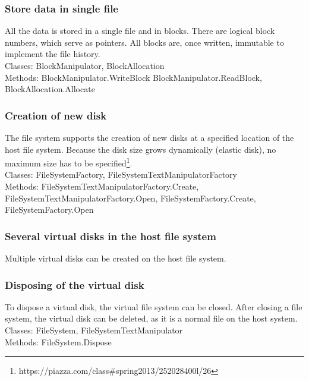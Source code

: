 \documentclass[JCDReport.tex]{subfiles}
\begin{document}
\subsubsection{Store data in single file}
All the data is stored in a single file and in blocks. There are logical block numbers, which serve as pointers. All blocks are, once written, immutable to implement the file history.\\
Classes: BlockManipulator, BlockAllocation\\
Methods: BlockManipulator.WriteBlock BlockManipulator.ReadBlock, BlockAllocation.Allocate

\subsubsection{Creation of new disk}
The file system supports the creation of new disks at a specified location of the host file system. Because the disk size grows dynamically (elastic disk), no maximum size has to be specified\footnote{https://piazza.com/class\#spring2013/252028400l/26}.\\
Classes: FileSystemFactory, FileSystemTextManipulatorFactory\\
Methods: FileSystemTextManipulatorFactory.Create, FileSystemTextManipulatorFactory.Open, FileSystemFactory.Create, FileSystemFactory.Open

\subsubsection{Several virtual disks in the host file system}
Multiple virtual disks can be created on the host file system.

\subsubsection{Disposing of the virtual disk}
To dispose a virtual disk, the virtual file system can be closed. After closing a file system, the virtual disk can be deleted, as it is a normal file on the host system.\\
Classes: FileSystem, FileSystemTextManipulator\\
Methods: FileSystem.Dispose
\end{document}
